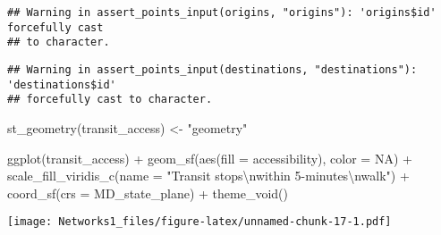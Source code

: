 \documentclass[
]{article}
\newenvironment{Shaded}{\begin{snugshade}}{\end{snugshade}}
\newcommand{\AttributeTok}[1]{\textcolor[rgb]{0.77,0.63,0.00}{#1}}
\newcommand{\ConstantTok}[1]{\textcolor[rgb]{0.00,0.00,0.00}{#1}}
\newcommand{\FunctionTok}[1]{\textcolor[rgb]{0.00,0.00,0.00}{#1}}
\newcommand{\NormalTok}[1]{#1}
\newcommand{\OtherTok}[1]{\textcolor[rgb]{0.56,0.35,0.01}{#1}}
\newcommand{\SpecialCharTok}[1]{\textcolor[rgb]{0.00,0.00,0.00}{#1}}
\newcommand{\StringTok}[1]{\textcolor[rgb]{0.31,0.60,0.02}{#1}}
\begin{document}
\begin{verbatim}
## Warning in assert_points_input(origins, "origins"): 'origins$id' forcefully cast
## to character.
\end{verbatim}

\begin{verbatim}
## Warning in assert_points_input(destinations, "destinations"): 'destinations$id'
## forcefully cast to character.
\end{verbatim}

\begin{Shaded}
\begin{Highlighting}[]
\FunctionTok{st\_geometry}\NormalTok{(transit\_access) }\OtherTok{\textless{}{-}} \StringTok{"geometry"}

\FunctionTok{ggplot}\NormalTok{(transit\_access) }\SpecialCharTok{+}
  \FunctionTok{geom\_sf}\NormalTok{(}\FunctionTok{aes}\NormalTok{(}\AttributeTok{fill =}\NormalTok{ accessibility), }\AttributeTok{color =} \ConstantTok{NA}\NormalTok{) }\SpecialCharTok{+}
  \FunctionTok{scale\_fill\_viridis\_c}\NormalTok{(}\AttributeTok{name =} \StringTok{"Transit stops}\SpecialCharTok{\textbackslash{}n}\StringTok{within 5{-}minutes}\SpecialCharTok{\textbackslash{}n}\StringTok{walk"}\NormalTok{) }\SpecialCharTok{+}
  \FunctionTok{coord\_sf}\NormalTok{(}\AttributeTok{crs =}\NormalTok{ MD\_state\_plane) }\SpecialCharTok{+}
  \FunctionTok{theme\_void}\NormalTok{()}
\end{Highlighting}
\end{Shaded}

\texttt{[image: Networks1\_files/figure-latex/unnamed-chunk-17-1.pdf]}
\end{document}
